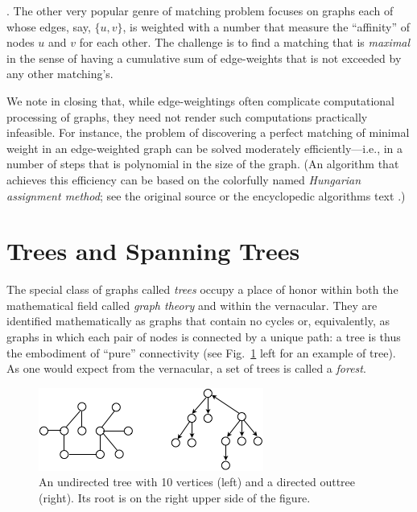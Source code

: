 \bigskip

.
The other very popular genre of matching problem focuses on graphs
each of whose edges, say, $\{u,v\}$, is weighted with a number that
measure the ``affinity'' of  nodes $u$ and $v$ for each other.  The
challenge is to find a matching that is {\em maximal}
 in the sense of having a cumulative
sum of edge-weights that is not exceeded by any other matching's.

We note in closing that, while edge-weightings often complicate
computational processing of graphs, they need not render such
computations practically infeasible.  For instance, the problem of
discovering a perfect matching of minimal weight in an edge-weighted
graph can be solved moderately efficiently---i.e., in a number of
steps that is polynomial in the size of the graph.  (An algorithm that
achieves this efficiency can be based on the colorfully named {\it
  Hungarian assignment method};   see the
original source \cite{Kuhn55} or the encyclopedic algorithms text
\cite{CLRS}.)











\section{Trees and Spanning Trees}
\label{sec:Trees}


The special class of graphs called {\it trees} 
 occupy a place of honor within both the mathematical
field called {\it graph theory} and within the vernacular.
They are identified mathematically as graphs that contain no
cycles or, equivalently, as graphs in which each pair of nodes is
connected by a unique path: a tree is thus the embodiment of ``pure''
connectivity (see Fig.~\ref{fig:tree} left for an example of tree).  As one
would expect from the vernacular, a set of trees is called a {\it
  forest}. 
\begin{figure}[hbt]
\begin{center}
       \includegraphics[scale=0.6]{FiguresGraph/tree}
       \caption{An undirected tree with 10 vertices (left) and a directed outtree (right).
       Its root is on the right upper side of the figure.}
  \label{fig:tree}
\end{center}
\end{figure}

